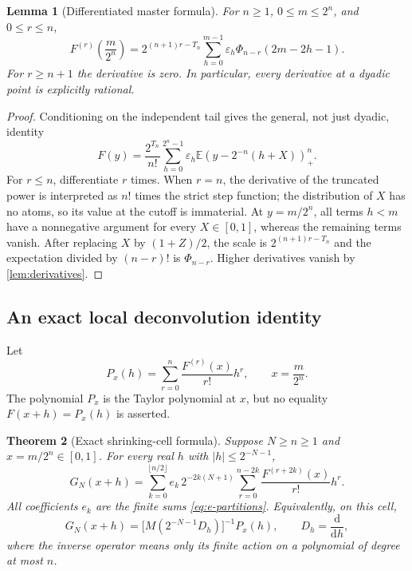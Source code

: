 \documentclass[11pt,a4paper]{article}
\numberwithin{equation}{section}
\newtheorem{theorem}{Theorem}[section]
\newtheorem{lemma}[theorem]{Lemma}
\theoremstyle{definition}
\theoremstyle{remark}
\newcommand{\E}{\mathbb E}
\newcommand{\eps}{\varepsilon}
\newcommand{\pos}[1]{\left(#1\right)_+}
\begin{document}
\begin{lemma}[Differentiated master formula]
\label{lem:derivative-master}
For $n\ge1$, $0\le m\le2^n$, and $0\le r\le n$,
\begin{equation}
 F^{(r)}\!\left(\frac m{2^n}\right)
 =2^{(n+1)r-T_n}
   \sum_{h=0}^{m-1}\eps_h\Phi_{n-r}(2m-2h-1).
 \label{eq:derivative-master}
\end{equation}
For $r\ge n+1$ the derivative is zero. In particular, every derivative at a dyadic point is explicitly rational.
\end{lemma}
\begin{proof}
Conditioning on the independent tail gives the general, not just dyadic, identity
\[
 F(y)=\frac{2^{T_n}}{n!}
  \sum_{h=0}^{2^n-1}\eps_h
    \E\pos{y-2^{-n}(h+X)}^n.
\]
For $r\le n$, differentiate $r$ times. When $r=n$, the derivative of the truncated power is interpreted as $n!$ times the strict step function; the distribution of $X$ has no atoms, so its value at the cutoff is immaterial. At $y=m/2^n$, all terms $h<m$ have a nonnegative argument for every $X\in[0,1]$, whereas the remaining terms vanish. After replacing $X$ by $(1+Z)/2$, the scale is $2^{(n+1)r-T_n}$ and the expectation divided by $(n-r)!$ is $\Phi_{n-r}$. Higher derivatives vanish by \cref{lem:derivatives}.
\end{proof}

\subsection{An exact local deconvolution identity}
Let
\begin{equation}
 P_x(h)=\sum_{r=0}^{n}\frac{F^{(r)}(x)}{r!}h^r,
 \qquad x=\frac m{2^n}.
 \label{eq:dyadic-Taylor-poly}
\end{equation}
The polynomial $P_x$ is the Taylor polynomial at $x$, but no equality $F(x+h)=P_x(h)$ is asserted.

\begin{theorem}[Exact shrinking-cell formula]
\label{thm:local-cell}
Suppose $N\ge n\ge1$ and $x=m/2^n\in[0,1]$. For every real $h$ with $|h|\le2^{-N-1}$,
\begin{equation}
 \boxed{\displaystyle
 G_N(x+h)=
 \sum_{k=0}^{\lfloor n/2\rfloor}e_k\,2^{-2k(N+1)}
  \sum_{r=0}^{n-2k}\frac{F^{(r+2k)}(x)}{r!}h^r.}
 \label{eq:local-cell}
\end{equation}
All coefficients $e_k$ are the finite sums \cref{eq:e-partitions}. Equivalently, on this cell,
\begin{equation}
 G_N(x+h)=\bigl[M(2^{-N-1}D_h)\bigr]^{-1}P_x(h),
 \qquad D_h=\frac{\mathrm d}{\mathrm dh},
 \label{eq:local-operator}
\end{equation}
where the inverse operator means only its finite action on a polynomial of degree at most $n$.
\end{theorem}
\end{document}
